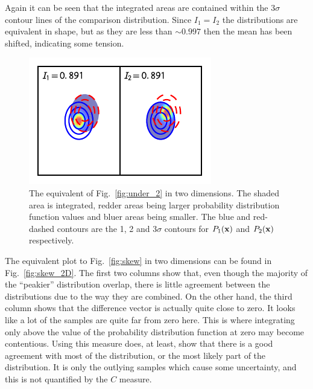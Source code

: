 \documentclass[twocolumn]{revtex4-1}
\begin{document}
    Again it can be seen that the integrated areas are contained within the 3$\sigma$ contour lines of the comparison distribution.
    Since $I_1 = I_2$ the distributions are equivalent in shape, but as they are less than $\sim0.997$ then the mean has been shifted, indicating some tension.
    \begin{figure}
        \centering
        \includegraphics{../comparison/plots/under_2D.pdf}
        \caption{The equivalent of Fig.~\ref{fig:under_2} in two dimensions.
                 The shaded area is integrated, redder areas being larger probability distribution function values and bluer areas being smaller.
                 The blue and red-dashed contours are the 1, 2 and 3$\sigma$ contours for $P_1({\bf x})$ and $P_2({\bf x})$ respectively.}
        \label{fig:under_2D}
    \end{figure} 
    \noindent The equivalent plot to Fig.~\ref{fig:skew} in two dimensions can be found in Fig.~\ref{fig:skew_2D}.
    The first two columns show that, even though the majority of the ``peakier'' distribution overlap, there is little agreement between the distributions due to the way they are combined.
    On the other hand, the third column shows that the difference vector is actually quite close to zero.
    It looks like a lot of the samples are quite far from zero here.
    This is where integrating only above the value of the probability distribution function at zero may become contentious.
    Using this measure does, at least, show that there is a good agreement with most of the distribution, or the most likely part of the distribution.
    It is only the outlying samples which cause some uncertainty, and this is not quantified by the $C$ measure.
\end{document}
